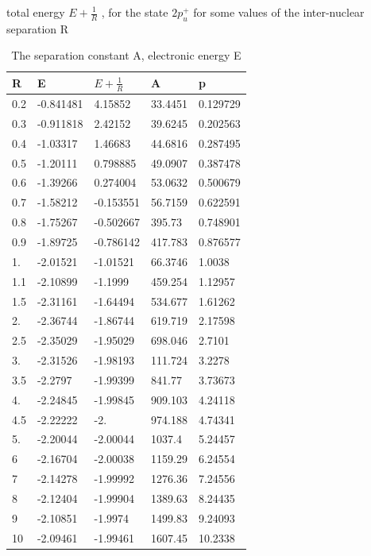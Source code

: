 \begin{table}[h!]
  \caption{ The separation constant A, electronic energy E}{ total energy $ E + \frac{1}{R} $ , for the state $ 2p_u^{+} $ for some values of the inter-nuclear separation R } 
  \centering
  \label{2sg}
		\begin{tabular}{ m{6em} m{6em}  m{6em}  m{6em} m{6em} }
			\hline
			R & E & $ E + \frac{1}{R} $ & A & p  \\ \hline \hline
  0.2 & -0.841481 & 4.15852 & 33.4451 & 0.129729\\
  0.3 & -0.911818 & 2.42152 & 39.6245 & 0.202563\\
  0.4 & -1.03317 & 1.46683 & 44.6816 & 0.287495\\
  0.5 & -1.20111 & 0.798885 & 49.0907 & 0.387478\\
  0.6 & -1.39266 & 0.274004 & 53.0632 & 0.500679\\
  0.7 & -1.58212 & -0.153551 & 56.7159 & 0.622591\\
  0.8 & -1.75267 & -0.502667 & 395.73 & 0.748901\\
  0.9 & -1.89725 & -0.786142 & 417.783 & 0.876577\\
  1. & -2.01521 & -1.01521 & 66.3746 & 1.0038\\
  1.1 & -2.10899 & -1.1999 & 459.254 & 1.12957\\
  1.5 & -2.31161 & -1.64494 & 534.677 & 1.61262\\
  2. & -2.36744 & -1.86744 & 619.719 & 2.17598\\
  2.5 & -2.35029 & -1.95029 & 698.046 & 2.7101\\
  3. & -2.31526 & -1.98193 & 111.724 & 3.2278\\
  3.5 & -2.2797 & -1.99399 & 841.77 & 3.73673\\
  4. & -2.24845 & -1.99845 & 909.103 & 4.24118\\
  4.5 & -2.22222 & -2. & 974.188 & 4.74341\\
  5. & -2.20044 & -2.00044 & 1037.4 & 5.24457\\
  6 & -2.16704 & -2.00038 & 1159.29 & 6.24554\\
  7 & -2.14278 & -1.99992 & 1276.36 & 7.24556\\
  8 & -2.12404 & -1.99904 & 1389.63 & 8.24435\\
  9 & -2.10851 & -1.9974 & 1499.83 & 9.24093\\
  10 & -2.09461 & -1.99461 & 1607.45 & 10.2338\\
		\hline
		\end{tabular}
\end{table}


